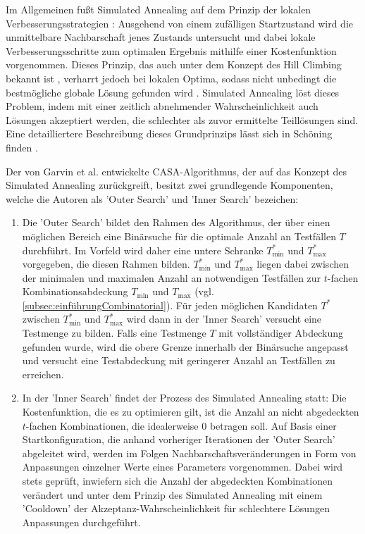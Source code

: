 Im Allgemeinen fußt Simulated Annealing auf dem Prinzip der lokalen Verbesserungsstrategien \cite[S. 330]{schoening2001algorithmik}: Ausgehend von einem zufälligen Startzustand wird die unmittelbare Nachbarschaft jenes Zustands untersucht und dabei lokale Verbesserungsschritte zum optimalen Ergebnis mithilfe einer Kostenfunktion vorgenommen. Dieses Prinzip, das auch unter dem Konzept des Hill Climbing bekannt ist \cite[S.327]{schoening2001algorithmik}, verharrt jedoch bei lokalen Optima, sodass nicht unbedingt die bestmögliche globale Lösung gefunden wird \cite[S.327]{schoening2001algorithmik}. Simulated Annealing löst dieses Problem, indem mit einer zeitlich abnehmender Wahrscheinlichkeit auch Lösungen akzeptiert werden, die schlechter als zuvor ermittelte Teillösungen sind. Eine detailliertere Beschreibung dieses Grundprinzips lässt sich in Schöning finden \cite[S.329 ff.]{schoening2001algorithmik}.

Der von Garvin et al. \cite{garvin2011evaluating} entwickelte CASA-Algorithmus, der auf das Konzept des Simulated Annealing zurückgreift, besitzt zwei grundlegende Komponenten, welche die Autoren als 'Outer Search' und 'Inner Search' bezeichen:
\begin{enumerate}
\item Die 'Outer Search' bildet den Rahmen des Algorithmus, der über einen möglichen Bereich eine Binärsuche für die optimale Anzahl an Testfällen $T$ durchführt. Im Vorfeld wird daher eine untere Schranke $T^*_{\min}$ und $T^*_{\max}$ vorgegeben, die diesen Rahmen bilden. $T^*_{\min}$ und $T^*_{\max}$ liegen dabei zwischen der minimalen und maximalen Anzahl an notwendigen Testfällen zur $t$-fachen Kombinationsabdeckung $T_{\min}$ und $T_{\max}$ (vgl. \autoref{subsec:einführungCombinatorial}). Für jeden möglichen Kandidaten $T^*$ zwischen  $T^*_{\min}$ und $T^*_{\max}$ wird dann in der 'Inner Search' versucht eine Testmenge zu bilden. Falls eine Testmenge $T$ mit vollständiger Abdeckung gefunden wurde, wird die obere Grenze innerhalb der Binärsuche angepasst und versucht eine Testabdeckung mit geringerer Anzahl an Testfällen zu erreichen.
\item In der 'Inner Search' findet der Prozess des Simulated Annealing statt: Die Kostenfunktion, die es zu optimieren gilt, ist die Anzahl an nicht abgedeckten $t$-fachen Kombinationen, die idealerweise 0 betragen soll. Auf Basis einer Startkonfiguration, die anhand vorheriger Iterationen der 'Outer Search' abgeleitet wird, werden im Folgen Nachbarschaftsveränderungen in Form von Anpassungen einzelner Werte eines Parameters vorgenommen. Dabei wird stets geprüft, inwiefern sich die Anzahl der abgedeckten Kombinationen verändert und unter dem Prinzip des Simulated Annealing mit einem 'Cooldown' der Akzeptanz-Wahrscheinlichkeit für schlechtere Lösungen Anpassungen durchgeführt.
\end{enumerate}

